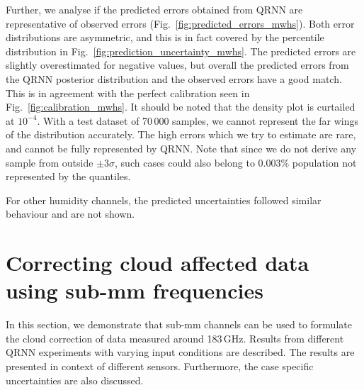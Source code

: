 \documentclass[amt, manuscript]{copernicus}
\begin{document}
Further, we analyse if the  predicted errors obtained from QRNN are representative of observed errors (Fig.~\ref{fig:predicted_errors_mwhs}). Both error distributions are asymmetric, and this is in fact covered by the percentile distribution  in Fig.~\ref{fig:prediction_uncertainty_mwhs}. The predicted errors are slightly overestimated for negative values, but overall the predicted errors from the QRNN posterior distribution and the observed errors have a good match. This is in agreement with the perfect calibration seen in Fig.~\ref{fig:calibration_mwhs}. It should be noted that the density plot is curtailed at $10^{-4}$. With a test dataset of 70\,000 samples, we cannot represent the far wings of the distribution accurately. The high errors which we try to estimate are rare, and cannot be fully represented by QRNN. Note that since we do not derive any sample from outside $\pm3\sigma$, such cases could also belong to 0.003\% population not represented by the quantiles.   

For other humidity channels, the predicted uncertainties followed similar behaviour and are not shown. 


\section{Correcting cloud affected data using sub-mm frequencies}
\label{qrnn_ici}
In this section, we demonstrate that sub-mm channels can be used to formulate the cloud correction of data measured around 183\,GHz. Results from different QRNN experiments with varying input conditions are described. The results are presented in context of different sensors. Furthermore, the case specific uncertainties are also discussed.
\end{document}
